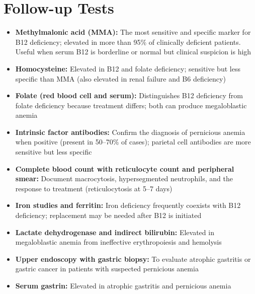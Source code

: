 \section*{Follow-up Tests}
\begin{itemize}
  \item \textbf{Methylmalonic acid (MMA):} The most sensitive and specific marker for B12 deficiency; elevated in more than 95\% of clinically deficient patients. Useful when serum B12 is borderline or normal but clinical suspicion is high
  \item \textbf{Homocysteine:} Elevated in B12 and folate deficiency; sensitive but less specific than MMA (also elevated in renal failure and B6 deficiency)
  \item \textbf{Folate (red blood cell and serum):} Distinguishes B12 deficiency from folate deficiency because treatment differs; both can produce megaloblastic anemia
  \item \textbf{Intrinsic factor antibodies:} Confirm the diagnosis of pernicious anemia when positive (present in 50--70\% of cases); parietal cell antibodies are more sensitive but less specific
  \item \textbf{Complete blood count with reticulocyte count and peripheral smear:} Document macrocytosis, hypersegmented neutrophils, and the response to treatment (reticulocytosis at 5--7 days)
  \item \textbf{Iron studies and ferritin:} Iron deficiency frequently coexists with B12 deficiency; replacement may be needed after B12 is initiated
  \item \textbf{Lactate dehydrogenase and indirect bilirubin:} Elevated in megaloblastic anemia from ineffective erythropoiesis and hemolysis
  \item \textbf{Upper endoscopy with gastric biopsy:} To evaluate atrophic gastritis or gastric cancer in patients with suspected pernicious anemia
  \item \textbf{Serum gastrin:} Elevated in atrophic gastritis and pernicious anemia
\end{itemize}

